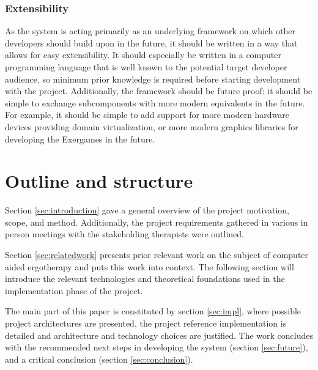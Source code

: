 \subsubsection{Extensibility}
\label{sec:nfr:extensibility}
As the system is acting primarily as an underlying framework on which other developers should build upon in the future, it should be written in a way that allows for easy extensibility. It should especially be written in a computer programming language that is well known to the potential target developer audience, so minimum prior knowledge is required before starting development with the project. Additionally, the framework should be future proof: it should be simple to exchange subcomponents with more modern equivalents in the future. For example, it should be simple to add support for more modern hardware devices providing domain virtualization, or more modern graphics libraries for developing the Exergames in the future.


\section{Outline and structure}
Section \ref{sec:introduction} gave a general overview of the project motivation, scope, and method. Additionally, the project requirements gathered in various in person meetings with the stakeholding therapists were outlined.

Section \ref{sec:relatedwork} presents prior relevant work on the subject of computer aided ergotherapy and puts this work into context. The following section will introduce the relevant technologies and theoretical foundations used in the implementation phase of the project.

The main part of this paper is constituted by section \ref{sec:impl}, where possible project architectures are presented, the project reference implementation is detailed and architecture and technology choices are justified. The work concludes with the recommended next steps in developing the system (section \ref{sec:future}), and a critical conclusion (section \ref{sec:conclusion}).

